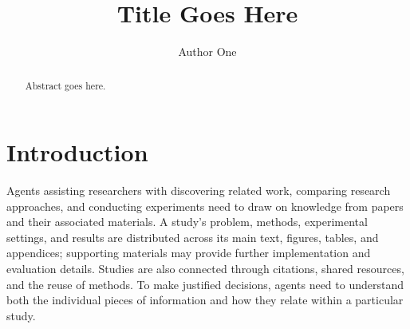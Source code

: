 \documentclass[sigconf,review,anonymous]{acmart}
\begin{document}
\title{Title Goes Here}

\author{Author One}

\renewcommand{\shortauthors}{Anonymous et al.}

\begin{abstract}
Abstract goes here.
\end{abstract}


\maketitle

\section{Introduction}
\label{sec:intro}

Agents assisting researchers with discovering related work, comparing research
approaches, and conducting experiments need to draw on knowledge from papers and
their associated materials. A study's problem, methods, experimental settings,
and results are distributed across its main text, figures, tables, and
appendices; supporting materials may provide further implementation and
evaluation details. Studies are also connected through citations, shared
resources, and the reuse of methods. To make justified decisions, agents need
to understand both the individual pieces of information and how they relate
within a particular study.
\end{document}
